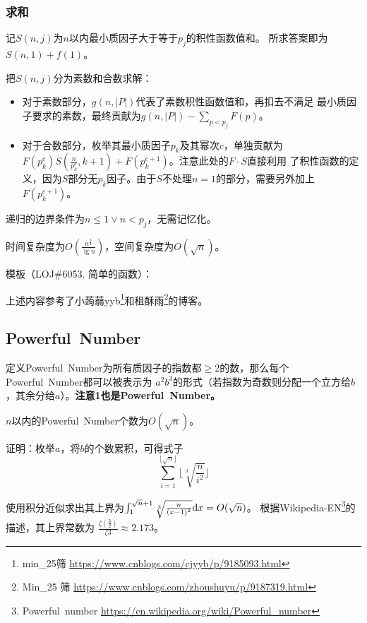 \subsubsection{求和}
记$S(n,j)$为$n$以内最小质因子大于等于$p_j$的积性函数值和。
所求答案即为$S(n,1)+f(1)$。

把$S(n,j)$分为素数和合数求解：
\begin{itemize}
    \item 对于素数部分，$g(n,|P|)$代表了素数积性函数值和，再扣去不满足
    最小质因子要求的素数，最终贡献为$g(n,|P|)-\displaystyle \sum_{p<p_j}F(p)$。
    \item 对于合数部分，枚举其最小质因子$p_k$及其幂次$c$，单独贡献为\\
    $F(p_k^c)S(\frac{n}{p_k^c},k+1)+F(p_k^{c+1})$。注意此处的$F\cdot S$直接利用
    了积性函数的定义，因为$S$部分无$p_k$因子。由于$S$不处理$n=1$的部分，需要另外加上
    $F(p_k^{c+1})$。
\end{itemize}

递归的边界条件为$n\leq 1 \vee n<p_j$，无需记忆化。

时间复杂度为$O(\frac{n^\frac{3}{4}}{\lg n})$，空间复杂度为$O(\sqrt{n})$。

模板（LOJ\#6053. 简单的函数）：


上述内容参考了小蒟蒻yyb\footnote{
    min\_25筛
    \url{https://www.cnblogs.com/cjyyb/p/9185093.html}
}和租酥雨\footnote{
    Min\_25 筛
    \url{https://www.cnblogs.com/zhoushuyu/p/9187319.html}
}的博客。
\subsection{Powerful~Number}
定义Powerful~Number为所有质因子的指数都$\geq 2$的数，那么每个Powerful~Number都可以被表示为
$a^2b^3$的形式（若指数为奇数则分配一个立方给$b$，其余分给$a$）。{\bfseries 注意1也是Powerful~Number。}

\begin{theorem}
    $n$以内的Powerful~Number个数为$O(\sqrt{n})$。
\end{theorem}

证明：枚举$a$，将$b$的个数累积，可得式子
\begin{displaymath}
    \sum_{i=1}^{\lfloor\sqrt{n}\rfloor}{\lfloor\sqrt[3]{\frac{n}{i^2}}\rfloor}
\end{displaymath}

使用积分近似求出其上界为$\int_1^{\sqrt{n}+1}{\sqrt[3]{\frac{n}{(x-1)^2}} \textrm{d} x}=O(\sqrt{n})$。
根据Wikipedia-EN\footnote{Powerful~number
    \url{https://en.wikipedia.org/wiki/Powerful\_number}}的描述，其上界常数为
    $\frac{\zeta(\frac{3}{2})}{\zeta{3}}\approx 2.173$。


